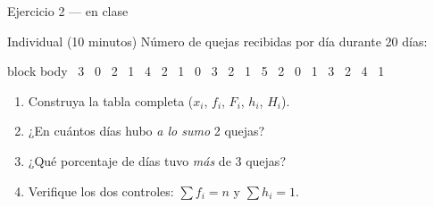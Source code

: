 \documentclass[aspectratio=169,10pt]{beamer}
\begin{document}
\begin{frame}{Ejercicio 2 — en clase}
  \begin{alertblock}{Individual (10 minutos)}
    \footnotesize
    Número de quejas recibidas por día durante 20 días:

    \vspace{0.2cm}
    \begin{beamercolorbox}[wd=0.9\textwidth,sep=0.12cm]{block body}
      \centering\scriptsize{} \ 3 \ 0 \ 2 \ 1 \ 4 \ 2 \ 1 \ 0 \ 3 \ 2 \ 1 \ 5 \ 2 \ 0 \ 1 \ 3 \ 2 \ 4 \ 1
    \end{beamercolorbox}

    \vspace{0.25cm}
    \begin{enumerate}
      \item Construya la tabla completa ($x_i$, $f_i$, $F_i$, $h_i$, $H_i$).
      \item ¿En cuántos días hubo \emph{a lo sumo} 2 quejas?
      \item ¿Qué porcentaje de días tuvo \emph{más} de 3 quejas?
      \item Verifique los dos controles: $\sum f_i = n$ y $\sum h_i = 1$.
    \end{enumerate}
  \end{alertblock}
\end{frame}
\end{document}
